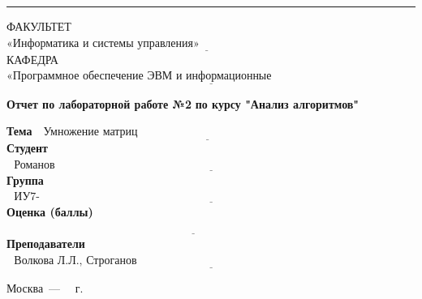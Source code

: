 \documentclass{bmstu}
\begin{document}
\begin{titlepage}
        \noindent\rule{18cm}{3pt}
        \newline\newline
        \noindent ФАКУЛЬТЕТ $\underline{\text{«Информатика и системы управления»~~~~~~~~~~~~~~~~~~~~~~~~~~~~~~~~~~~~~~~~~~~~~~~~~~~~~~~}}$ \newline\newline
        \noindent КАФЕДРА $\underline{\text{«Программное обеспечение ЭВМ и информационные технологии»~~~~~~~~~~~~~~~~~~~~~~~}}$\newline\newline\newline\newline\newline\newline\newline


        \begin{center}
            \Large\textbf{Отчет по лабораторной работе №2}
            \Large\textbf{по курсу "Анализ алгоритмов"}
        \end{center}

        \noindent\textbf{Тема} $\underline{\text{~~Умножение матриц~~~~~~~~~~~~~~~~~~~~~~~~~~~~~~~~~~~~~~~~~~~~~~~~~~~~~~~~~~~~~~~~}}$\newline\newline\newline
        \noindent\textbf{Студент} $\underline{\text{~~Романов С.К.~~~~~~~~~~~~~~~~~~~~~~~~~~~~~~~~~~~~~~~~~~~~~~~~~~~~~~~~~~~~~~~~~~~~~~~~~~~~~~~~~~~~~~~~~}}$\newline\newline
        \noindent\textbf{Группа} $\underline{\text{~~ИУ7-55Б~~~~~~~~~~~~~~~~~~~~~~~~~~~~~~~~~~~~~~~~~~~~~~~~~~~~~~~~~~~~~~~~~~~~~~~~~~~~~~~~~~~~~~~~~~~~~~~~~}}$\newline\newline
        \noindent\textbf{Оценка (баллы)} $\underline{\text{~~~~~~~~~~~~~~~~~~~~~~~~~~~~~~~~~~~~~~~~~~~~~~~~~~~~~~~~~~~~~~~~~~~~~~~~~~~~~~~~~~~~~~~~~~~~~~~~~~~}}$\newline\newline
        \noindent\textbf{Преподаватели} $\underline{\text{~~Волкова Л.Л., Строганов Ю.В.~~~~~~~~~~~~~~~~~~~~~~~~~~~~~~~~~~~~~~~~~~~~~~~~~~~~~~~~~~~~~~~~~~~~~~~~~~~~~~}}$\newline

        \begin{center}
            \vfill
            Москва~---~\the\year
            ~г.
        \end{center}
        \restoregeometry
    \end{titlepage}

\tableofcontents









%

\makebibliography
\end{document}
